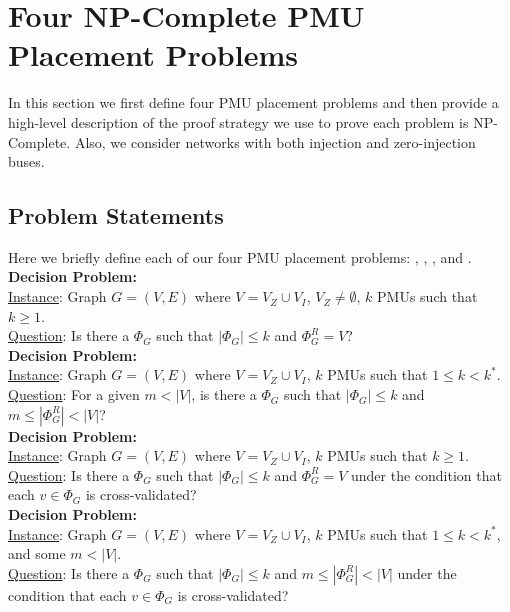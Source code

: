 \section{Four NP-Complete PMU Placement Problems}
\label{sec:problem-analysis}

In this section we first define four PMU placement problems and then provide a high-level description of the proof strategy we use to prove each problem is NP-Complete.
Also, we consider networks with both injection and zero-injection buses.


\subsection{Problem Statements}

Here we briefly define each of our four PMU placement problems: \fulls, \maxinc, \xvalparts, and \xvals. \\ 
{\bf \full Decision Problem:} \\
\indent \underline{Instance}: Graph $G=(V,E)$ where $V=V_Z \cup V_I$, $V_Z \neq \emptyset$, $k$ PMUs such that $k \geq 1$. \\
\indent \underline{Question}: Is there a $\Phi_G$ such that $|\Phi_G| \leq k$ and $\Phi^R_G = V$?  \\
{\bf \maxinc Decision Problem:} \\
\indent \underline{Instance}: Graph $G=(V,E)$ where $V=V_Z \cup V_I$, $k$ PMUs such that $1 \leq k < k^*$. \\
\indent \underline{Question}: For a given $m< |V|$, is there a $\Phi_G$ such that $|\Phi_G| \leq k$ and $m \leq |\Phi^R_G| < |V|$? \\
{\bf \xval Decision Problem:} \\
\indent \underline{Instance}: Graph $G=(V,E)$ where $V=V_Z \cup V_I$, $k$ PMUs such that $k \geq 1$. \\
\indent \underline{Question}: Is there a $\Phi_G$ such that $|\Phi_G| \leq k$ and $\Phi^R_G = V$ under the condition that each $v \in \Phi_G$ is cross-validated? \\
{\bf \xvalpart Decision Problem:} \\
\indent \underline{Instance}: Graph $G=(V,E)$ where $V=V_Z \cup V_I$, $k$ PMUs such that $1 \leq k < k^*$, and some $m<|V|$. \\
\indent \underline{Question}: Is there a $\Phi_G$ such that $|\Phi_G| \leq k$ and $m \leq|\Phi^R_G| < |V|$ under the condition that each $v \in \Phi_G$ is cross-validated?


